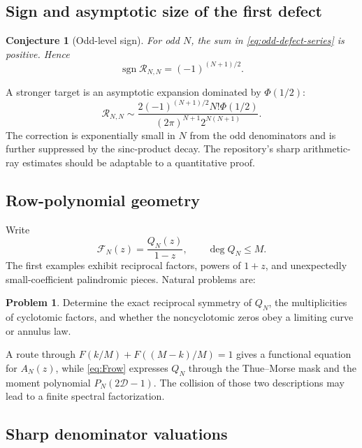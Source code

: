 \documentclass[11pt,oneside]{article}
\numberwithin{equation}{section}
\newtheorem{conjecture}[theorem]{Conjecture}
\theoremstyle{definition}
\newtheorem{problem}[theorem]{Problem}
\theoremstyle{remark}
\newcommand{\Dop}{\mathcal D}
\newcommand{\Frow}{\mathscr F}
\newcommand{\defect}{\mathcal R}
\DeclareMathOperator{\sgn}{sgn}
\begin{document}
\subsection{Sign and asymptotic size of the first defect}

\begin{conjecture}[Odd-level sign]
For odd \(N\), the sum in \eqref{eq:odd-defect-series} is positive.  Hence
\begin{equation}
 \sgn\defect_{N,N}=(-1)^{(N+1)/2}.
 \label{eq:odd-sign-conj}
\end{equation}
\end{conjecture}

A stronger target is an asymptotic expansion dominated by \(\Phi(1/2)\):
\begin{equation}
 \defect_{N,N}
 \sim\frac{2(-1)^{(N+1)/2}N!\Phi(1/2)}
 {(2\pi)^{N+1}2^{N(N+1)}}.
 \label{eq:defect-first-harmonic}
\end{equation}
The correction is exponentially small in \(N\) from the odd denominators and is further
suppressed by the sinc-product decay.  The repository's sharp arithmetic-ray estimates
should be adaptable to a quantitative proof.

\subsection{Row-polynomial geometry}

Write
\begin{equation}
 \Frow_N(z)=\frac{Q_N(z)}{1-z},
 \qquad \deg Q_N\le M.
 \label{eq:QN-row}
\end{equation}
The first examples exhibit reciprocal factors, powers of \(1+z\), and unexpectedly
small-coefficient palindromic pieces.  Natural problems are:
\begin{problem}
Determine the exact reciprocal symmetry of \(Q_N\), the multiplicities of cyclotomic
factors, and whether the noncyclotomic zeros obey a limiting curve or annulus law.
\end{problem}
A route through \(F(k/M)+F((M-k)/M)=1\) gives a functional equation for \(A_N(z)\), while
\eqref{eq:Frow} expresses \(Q_N\) through the Thue--Morse mask and the moment polynomial
\(P_N(2\Dop-1)\).  The collision of those two descriptions may lead to a finite spectral
factorization.

\subsection{Sharp denominator valuations}
\end{document}
